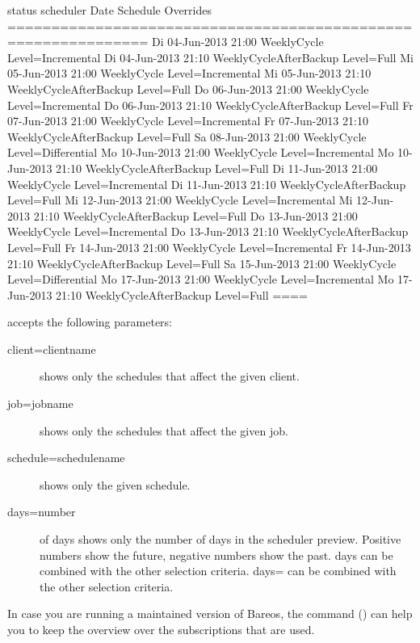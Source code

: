 \begin{description}
\begin{bconsole}{status scheduler}
Date                  Schedule                Overrides
==============================================================
Di 04-Jun-2013 21:00  WeeklyCycle             Level=Incremental
Di 04-Jun-2013 21:10  WeeklyCycleAfterBackup  Level=Full
Mi 05-Jun-2013 21:00  WeeklyCycle             Level=Incremental
Mi 05-Jun-2013 21:10  WeeklyCycleAfterBackup  Level=Full
Do 06-Jun-2013 21:00  WeeklyCycle             Level=Incremental
Do 06-Jun-2013 21:10  WeeklyCycleAfterBackup  Level=Full
Fr 07-Jun-2013 21:00  WeeklyCycle             Level=Incremental
Fr 07-Jun-2013 21:10  WeeklyCycleAfterBackup  Level=Full
Sa 08-Jun-2013 21:00  WeeklyCycle             Level=Differential
Mo 10-Jun-2013 21:00  WeeklyCycle             Level=Incremental
Mo 10-Jun-2013 21:10  WeeklyCycleAfterBackup  Level=Full
Di 11-Jun-2013 21:00  WeeklyCycle             Level=Incremental
Di 11-Jun-2013 21:10  WeeklyCycleAfterBackup  Level=Full
Mi 12-Jun-2013 21:00  WeeklyCycle             Level=Incremental
Mi 12-Jun-2013 21:10  WeeklyCycleAfterBackup  Level=Full
Do 13-Jun-2013 21:00  WeeklyCycle             Level=Incremental
Do 13-Jun-2013 21:10  WeeklyCycleAfterBackup  Level=Full
Fr 14-Jun-2013 21:00  WeeklyCycle             Level=Incremental
Fr 14-Jun-2013 21:10  WeeklyCycleAfterBackup  Level=Full
Sa 15-Jun-2013 21:00  WeeklyCycle             Level=Differential
Mo 17-Jun-2013 21:00  WeeklyCycle             Level=Incremental
Mo 17-Jun-2013 21:10  WeeklyCycleAfterBackup  Level=Full
====
\end{bconsole}

 accepts the following parameters:
\begin{description}
    \item[client=clientname] shows only the schedules that affect the given client.
    \item[job=jobname] shows only the schedules that affect the given job.
    \item[schedule=schedulename] shows only the given schedule.
    \item[days=number] of days shows only the number of days in the scheduler preview. Positive numbers show the future, negative numbers show the past. days can be combined with the other selection criteria. days= can be combined with the other selection criteria.
\end{description}

In case you are running a maintained version of Bareos,
the command  () can help you to keep the overview over the subscriptions
that are used.


\end{description}
